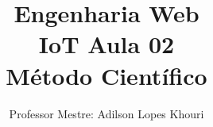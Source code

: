 \documentclass[compress, hyperref={pdfpagelayout=SinglePage}]{beamer}
\title[IoT - Aula 02]{Engenharia Web \\ IoT Aula 02 \\ Método Científico}
\author{Professor Mestre: Adilson Lopes Khouri}
\begin{document}
	\begin{frame}
		\titlepage
	\end{frame}
	
	
	
	
	
	
%	
%	
				
	

	
	
\end{document}
